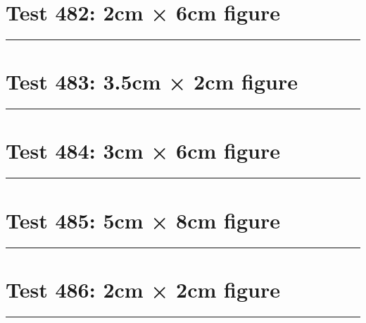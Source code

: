 \documentclass[a4paper,11pt]{article}
\begin{document}
\section*{Test 482: 2cm × 6cm figure}
\begin{swarmwrap}%
  \begin{minipage}[t]{2cm}
    \centering
    \rule{\linewidth}{6cm}
  \end{minipage}%
\end{swarmwrap}%
\swarmwrapnext
\lipsum[148]
\lipsum[149]
\lipsum[150]
\lipsum[1]
\section*{Test 483: 3.5cm × 2cm figure}
\begin{swarmwrap}%
  \begin{minipage}[t]{3cm}
    \centering
    \rule{\linewidth}{2cm}
  \end{minipage}%
\end{swarmwrap}%
\swarmwrapnext
\lipsum[141]
\lipsum[142]
\lipsum[143]
\lipsum[144]
\lipsum[145]
\lipsum[146]
\section*{Test 484: 3cm × 6cm figure}
\begin{swarmwrap}%
  \begin{minipage}[t]{3cm}
    \centering
    \rule{\linewidth}{6cm}
  \end{minipage}%
\end{swarmwrap}%
\swarmwrapnext
\lipsum[64]
\lipsum[65]
\lipsum[66]
\lipsum[67]
\lipsum[68]
\lipsum[69]
\section*{Test 485: 5cm × 8cm figure}
\begin{swarmwrap}%
  \begin{minipage}[t]{5cm}
    \centering
    \rule{\linewidth}{8cm}
  \end{minipage}%
\end{swarmwrap}%
\swarmwrapnext
\lipsum[118]
\lipsum[119]
\lipsum[120]
\lipsum[121]
\lipsum[122]
\section*{Test 486: 2cm × 2cm figure}
\begin{swarmwrap}%
  \begin{minipage}[t]{2cm}
    \centering
    \rule{\linewidth}{2cm}
  \end{minipage}%
\end{swarmwrap}%
\swarmwrapnext
\lipsum[114]
\lipsum[115]
\lipsum[116]
\lipsum[117]
\end{document}
